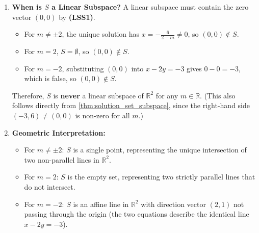 \begin{exercisesolution*}
\begin{enumerate}[label=\textbf{(\alph*)}]
    \item \textbf{When is $S$ a Linear Subspace?}
    A linear subspace must contain the zero vector $(0, 0)$ by \textbf{(LSS1)}.
    \begin{itemize}
        \item For $m \ne \pm 2$, the unique solution has $x = -\frac{6}{2 - m} \ne 0$, so $(0, 0) \notin S$.
        \item For $m = 2$, $S = \emptyset$, so $(0, 0) \notin S$.
        \item For $m = -2$, substituting $(0, 0)$ into $x - 2y = -3$ gives $0 - 0 = -3$, which is false, so $(0, 0) \notin S$.
    \end{itemize}
    Therefore, $S$ is \textbf{never} a linear subspace of $\mathbb{R}^2$ for any $m \in \mathbb{R}$. (This also follows directly from \cref{thm:solution_set_subspace}, since the right-hand side $(-3, 6) \ne (0, 0)$ is non-zero for all $m$.)

    \item \textbf{Geometric Interpretation:}
    \begin{itemize}
        \item For $m \ne \pm 2$: $S$ is a single point, representing the unique intersection of two non-parallel lines in $\mathbb{R}^2$.
        \item For $m = 2$: $S$ is the empty set, representing two strictly parallel lines that do not intersect.
        \item For $m = -2$: $S$ is an affine line in $\mathbb{R}^2$ with direction vector $(2, 1)$ not passing through the origin (the two equations describe the identical line $x - 2y = -3$).
    \end{itemize}
\end{enumerate}
\end{exercisesolution*}

